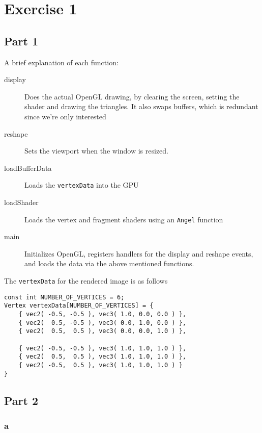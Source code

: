 \section{Exercise 1}
\subsection{Part 1}
A brief explanation of each function:

\begin{description}
\item [display] Does the actual OpenGL drawing, by clearing the screen, setting the shader and drawing the triangles. It also swaps buffers, which is redundant since we're only interested

\item [reshape] Sets the viewport when the window is resized.

\item[loadBufferData] Loads the \texttt{vertexData} into the GPU

\item[loadShader] Loads the vertex and fragment shaders using an
  \texttt{Angel} function

\item[main] Initializes OpenGL, registers handlers for the display and reshape events, and loads the data via the above mentioned functions.

\end{description}
The \texttt{vertexData} for the rendered image is as follows

\begin{lstlisting}
const int NUMBER_OF_VERTICES = 6;
Vertex vertexData[NUMBER_OF_VERTICES] = {
	{ vec2( -0.5, -0.5 ), vec3( 1.0, 0.0, 0.0 ) },
	{ vec2(  0.5, -0.5 ), vec3( 0.0, 1.0, 0.0 ) },
	{ vec2(  0.5,  0.5 ), vec3( 0.0, 0.0, 1.0 ) },

	{ vec2( -0.5, -0.5 ), vec3( 1.0, 1.0, 1.0 ) },
	{ vec2(  0.5,  0.5 ), vec3( 1.0, 1.0, 1.0 ) },
	{ vec2( -0.5,  0.5 ), vec3( 1.0, 1.0, 1.0 ) }
}
\end{lstlisting}

\subsection{Part 2}

\subsubsection{a}

